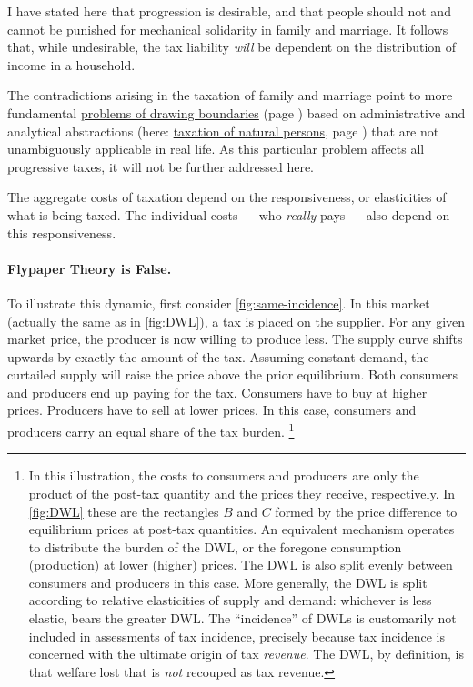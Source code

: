 I have stated here that progression is desirable, and that people should not and cannot be punished for mechanical solidarity in family and marriage.
It follows that, while undesirable, the tax liability \emph{will} be dependent on the distribution of income in a household.

The contradictions arising in the taxation of family and marriage point to more fundamental \href{sec:work-play}{problems of drawing boundaries} (page \pageref{sec:work-play}) based on administrative and analytical abstractions (here:
\hyperref[des:personal-taxation]{taxation of natural persons}, page \pageref{des:personal-taxation}) that are not unambiguously applicable in real life.
As this particular problem affects all progressive taxes, it will not be further addressed here.

 The aggregate costs of taxation depend on the responsiveness, or elasticities of what is being taxed.
The individual costs --- who \emph{really} pays --- also depend on this responsiveness.

\paragraph{Flypaper Theory is False.}
To illustrate this dynamic, first consider \autoref{fig:same-incidence}.
In this market (actually the same as in \autoref{fig:DWL}), a tax is placed on the supplier.
For any given market price, the producer is now willing to produce less.
The supply curve shifts upwards by exactly the amount of the tax.
Assuming constant demand, the curtailed supply will raise the price above the prior equilibrium.
Both consumers and producers end up paying for the tax.
Consumers have to buy at higher prices.
Producers have to sell at lower prices.
In this case, consumers and producers carry an equal share of the tax burden.
\footnote{
	In this illustration, the costs to consumers and producers are only the product of the post-tax quantity and the prices they receive, respectively.
	In \autoref{fig:DWL} these are the rectangles $B$ and $C$ formed by the price difference to equilibrium prices at post-tax quantities.
	An equivalent mechanism operates to distribute the burden of the DWL, or the foregone consumption (production) at lower (higher) prices.
	The DWL is also split evenly between consumers and producers in this case.
	More generally, the DWL is split according to relative elasticities of supply and demand:
	whichever is less elastic, bears the greater DWL.
	The ``incidence'' of DWLs is customarily not included in assessments of tax incidence, precisely because tax incidence is concerned with the ultimate origin of tax \emph{revenue}.
	The DWL, by definition, is that welfare lost that is \emph{not} recouped as tax revenue.
}

